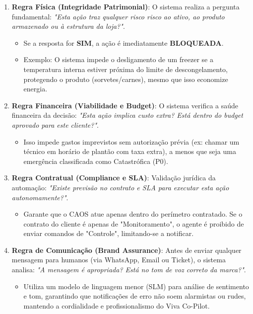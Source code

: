 \documentclass[12pt, a4paper]{article}
\begin{document}
\begin{enumerate}
    \item \textbf{Regra Física (Integridade Patrimonial)}: 
    O sistema realiza a pergunta fundamental: \textit{"Esta ação traz qualquer risco risco ao ativo, ao produto armazenado ou à estrutura da loja?"}.
    \begin{itemize}
        \item Se a resposta for \textbf{SIM}, a ação é imediatamente \textbf{BLOQUEADA}.
        \item Exemplo: O sistema impede o desligamento de um freezer se a temperatura interna estiver próxima do limite de descongelamento, protegendo o produto (sorvetes/carnes), mesmo que isso economize energia.
    \end{itemize}

    \item \textbf{Regra Financeira (Viabilidade e Budget)}:
    O sistema verifica a saúde financeira da decisão: \textit{"Esta ação implica custo extra? Está dentro do budget aprovado para este cliente?"}.
    \begin{itemize}
        \item Isso impede gastos imprevistos sem autorização prévia (ex: chamar um técnico em horário de plantão com taxa extra), a menos que seja uma emergência classificada como Catastrófica (P0).
    \end{itemize}

    \item \textbf{Regra Contratual (Compliance e SLA)}:
    Validação jurídica da automação: \textit{"Existe previsão no contrato e SLA para executar esta ação autonomamente?"}.
    \begin{itemize}
        \item Garante que o CAOS atue apenas dentro do perímetro contratado. Se o contrato do cliente é apenas de "Monitoramento", o agente é proibido de enviar comandos de "Controle", limitando-se a notificar.
    \end{itemize}

    \item \textbf{Regra de Comunicação (Brand Assurance)}:
    Antes de enviar qualquer mensagem para humanos (via WhatsApp, Email ou Ticket), o sistema analisa: \textit{"A mensagem é apropriada? Está no tom de voz correto da marca?"}.
    \begin{itemize}
        \item Utiliza um modelo de linguagem menor (SLM) para análise de sentimento e tom, garantindo que notificações de erro não soem alarmistas ou rudes, mantendo a cordialidade e profissionalismo do Viva Co-Pilot.
    \end{itemize}
\end{enumerate}
\end{document}
